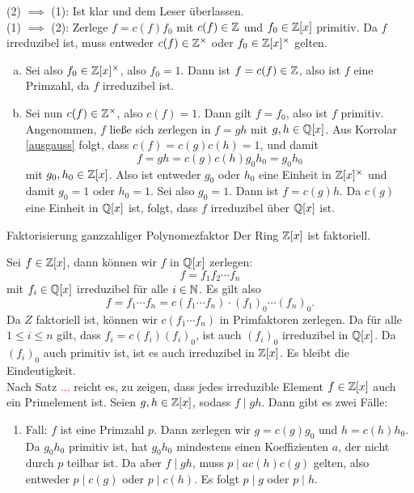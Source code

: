 \begin{beweis}
(2) $\implies$ (1): Ist klar und dem Leser überlassen.\\
(1) $\implies$ (2): Zerlege $f= c(f)f_0$ mit $c(f) \in \mathbb{Z}$ und $f_0 \in \mathbb{Z}[x]$ primitiv. Da $f$ irreduzibel ist, muss entweder $c(f)\in \mathbb{Z}^\times$ oder $f_0 \in \mathbb{Z}[x]^\times$ gelten.
\begin{enumerate}[(a)]
\item Sei also $f_0 \in \mathbb{Z}[x]^\times$, also $f_0 = 1$. Dann ist $f = c(f) \in \mathbb{Z}$, also ist $f$ eine Primzahl, da $f$ irreduzibel ist.
\item Sei nun $c(f)\in \mathbb{Z}^\times$, also $c(f)=1$. Dann gilt $f=f_0$, also ist $f$ primitiv. Angenommen, $f$ ließe sich zerlegen in $f=gh$ mit $g,h \in \mathbb{Q}[x]$. Aus Korrolar \ref{ausgauss} folgt, dass $c(f)=c(g)c(h)=1$, und damit 
\begin{equation}
f=gh=c(g)c(h)g_0h_0=g_0h_0
\end{equation}
mit $g_0,h_0 \in \mathbb{Z}[x]$. Also ist entweder $g_0$ oder $h_0$ eine Einheit in $\mathbb{Z}[x]^\times$ und damit $g_0=1$ oder $h_0=1$. Sei also $g_0=1$. Dann ist $f=c(g)h$. Da $c(g)$ eine Einheit in $\mathbb{Q}[x]$ ist, folgt, dass $f$ irreduzibel über $\mathbb{Q}[x]$ ist.
\end{enumerate}
\end{beweis}
\begin{theorem}{Faktorisierung ganzzahliger Polynome}{zfaktor}
Der Ring $\mathbb{Z}[x]$ ist faktoriell.
\end{theorem}
\begin{beweis}
Sei $f \in \mathbb{Z}[x]$, dann können wir $f$ in $\mathbb{Q}[x]$ zerlegen:
\begin{equation}
f= f_1 f_2 \cdots f_n
\end{equation}
mit $f_i \in \mathbb{Q}[x]$ irreduzibel für alle $i \in \mathbb{N}$. Es gilt also
\begin{equation}
f= f_1 \cdots f_n = c(f_1 \cdots f_n) \cdot (f_1)_0 \cdots (f_n)_0.
\end{equation}
Da $Z$ faktoriell ist, können wir $c(f_1 \cdots f_n)$ in Primfaktoren zerlegen. Da für alle $1 \leq i \leq n$ gilt, dass $f_i = c(f_i)(f_i)_0$, ist auch $(f_i)_0$ irreduzibel in $\mathbb{Q}[x]$. Da $(f_i)_0$ auch primitiv ist, ist es auch irreduzibel in $\mathbb{Z}[x]$. Es bleibt die Eindeutigkeit.\\
Nach Satz \textcolor{red}{$\dots$} reicht es, zu zeigen, dass jedes irreduzible Element $f \in \mathbb{Z}[x]$ auch ein Primelement ist. Seien $g,h \in \mathbb{Z}[x]$, sodass $f \mid gh$. Dann gibt es zwei Fälle:
\begin{enumerate}
\item Fall: $f$ ist eine Primzahl $p$. Dann zerlegen wir $g=c(g)g_0$ und $h=c(h)h_0$. Da $g_0h_0$ primitiv ist, hat $g_0h_0$ mindestens einen Koeffizienten $a$, der nicht durch $p$ teilbar ist. Da aber $f \mid gh$, muss $p \mid ac(h)c(g)$ gelten, also entweder $p \mid c(g)$ oder $p \mid c(h)$. Es folgt $p \mid g$ oder $p \mid h$.
\end{enumerate}
\end{beweis}

